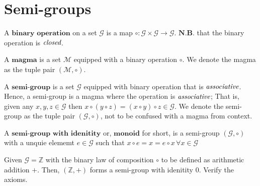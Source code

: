 \section{Semi-groups} %
\label{sec:semi-groups}

\begin{defn}
 A $\textbf{binary operation}$ on a set $\mathcal{G}$ is a map
 $\circ : \mathcal{G} \times \mathcal{G} \to \mathcal{G}$.
 $\textbf{N.B.}$ that the binary operation is $\emph{closed}$.
\end{defn}

\begin{defn}[magma]
 A $\textbf{magma}$ is a set $\mathcal{M}$ equipped with a binary operation $\circ$.
 We denote the magma as the tuple pair $(\mathcal{M}, \circ)$.
\end{defn}


\begin{defn}
 A $\textbf{semi-group}$ is a set $\mathcal{G}$ equipped with binary operation that is $\emph{associative}$.
 Hence, a semi-group is a magma where the operation is $\emph{associative}$;
 That is, given any $x,y,z \in \mathcal{G}$ then $x \circ (y \circ z) = (x \circ y) \circ z \in \mathcal{G}$.
 We denote the semi-group as the tuple pair $(\mathcal{G}, \circ)$, not to be confused with a magma from context.
\end{defn}

\begin{defn}[monoid]
 A $\textbf{semi-group with idenitity}$ or, $\textbf{monoid}$ for short, is a semi-group $(\mathcal{G}, \circ)$
 with a unquie elememt $e \in \mathcal{G}$ such that $x \circ e = x = e \circ x \, \forall x \in \mathcal{G}$
\end{defn}




\begin{exmp}
 Given $\mathcal{G} = \mathbb{Z}$ with the binary law of composition $\circ$ to be defined as arithmetic addition $+$.
 Then, $(\mathbb{Z}, +)$ forms a semi-group with idenitity $0$. Verify the axioms.
\end{exmp}
